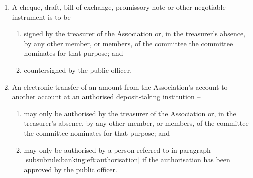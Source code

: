 \begin{enumerate}
	\item A cheque, draft, bill of exchange, promissory note or other negotiable instrument is to be --
	\begin{enumerate}
		\item signed by the treasurer of the Association or, in the treasurer's absence, by any other member, or members, of the committee the committee nominates for that purpose; and
		\item countersigned by the public officer.
	\end{enumerate}
	
	\item \label{subrule:banking:eft} An electronic transfer of an amount from the Association's account to another account at an authorised deposit-taking institution --
	\begin{enumerate}
		\item \label{subsubrule:banking:eft:authorisation} may only be authorised by the treasurer of the Association or, in the treasurer's absence, by any other member, or members, of the committee the committee nominates for that purpose; and
		\item may only be authorised by a person referred to in paragraph \ref{subsubrule:banking:eft:authorisation} if the authorisation has been approved by the public officer.
	\end{enumerate}
\end{enumerate}
